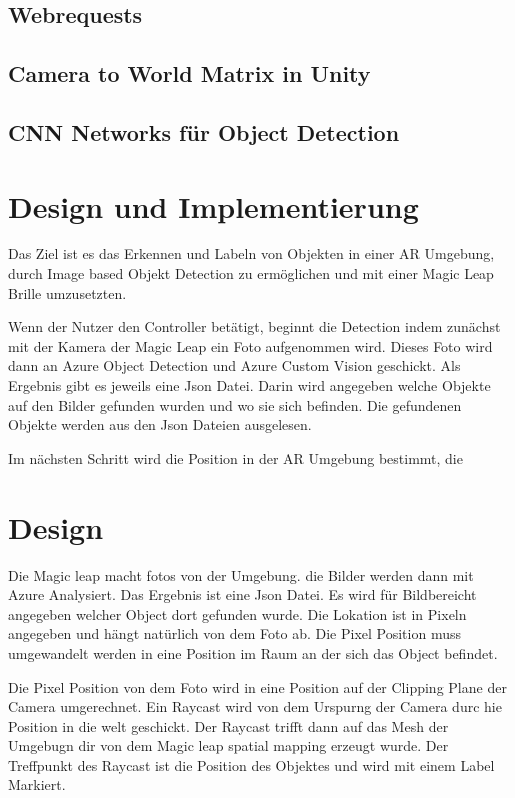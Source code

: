 \documentclass[german,a4paper, 12pt]{llncs}
\begin{document}
\subsection{Webrequests}
\subsection{Camera to World Matrix in Unity}
\subsection{CNN Networks für Object Detection}

\section{Design und Implementierung}
Das Ziel ist es das Erkennen und Labeln von Objekten in einer AR Umgebung, durch Image based Objekt Detection zu ermöglichen und mit einer Magic Leap Brille umzusetzten.

Wenn der Nutzer den Controller betätigt, beginnt die Detection indem zunächst mit der Kamera der Magic Leap ein Foto aufgenommen wird. 
Dieses Foto wird dann an Azure Object Detection und Azure Custom Vision geschickt. 
Als Ergebnis gibt es jeweils eine Json Datei. Darin wird angegeben welche Objekte auf den Bilder gefunden wurden und wo sie sich befinden. 
Die gefundenen Objekte werden aus den Json Dateien ausgelesen. 

Im nächsten Schritt wird die Position in der AR Umgebung bestimmt, die 
\section{Design}
Die Magic leap macht fotos von der Umgebung. die Bilder werden dann mit Azure Analysiert. Das Ergebnis ist eine Json Datei. Es wird für Bildbereicht angegeben welcher Object dort gefunden wurde.
Die Lokation ist in Pixeln angegeben und hängt natürlich von dem Foto ab.
Die Pixel Position muss umgewandelt werden in eine Position im Raum an der sich das Object befindet.

Die Pixel Position von dem Foto wird in eine Position auf der Clipping Plane der Camera umgerechnet. Ein Raycast wird von dem Urspurng der Camera durc hie Position in die welt geschickt. Der Raycast trifft dann auf das Mesh der Umgebugn dir von dem Magic leap spatial mapping erzeugt wurde.
Der Treffpunkt des Raycast ist die Position des Objektes und wird mit einem Label Markiert. 
\end{document}
